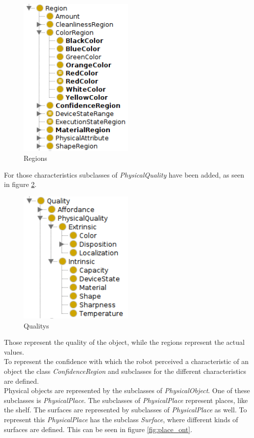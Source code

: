\documentclass[main.tex]{subfiles}
\begin{document}
\begin{figure}
\centering
\includegraphics[width=0.5\textwidth]{pictures/ontology/Ontologie_region}
\caption{Regions}
\label{fig:region_ont}
\end{figure}

For those characteristics subclasses of \textit{PhysicalQuality} have been added, as seen in figure \ref{fig:quality_ont}.

\begin{figure}
\centering
\includegraphics[width=0.5\textwidth]{pictures/ontology/Ontologie_quality}
\caption{Qualitys}
\label{fig:quality_ont}
\end{figure}

 Those represent the quality of the object, while the regions represent the actual values.\\
To represent the confidence with which the robot perceived a characteristic of an object the class \textit{ConfidenceRegion} and subclasses for the different characteristics are defined.\\
Physical objects are represented by the subclasses of \textit{PhysicalObject}.
One of these subclasses is \textit{PhysicalPlace}. The subclasses of \textit{PhysicalPlace} represent places, like the shelf. The surfaces are represented by subclasses of \textit{PhysicalPlace} as well. To represent this \textit{PhysicalPlace} has the subclass \textit{Surface}, where different kinds of surfaces are defined. This can be seen in figure \ref{fig:place_ont}.
\end{document}
